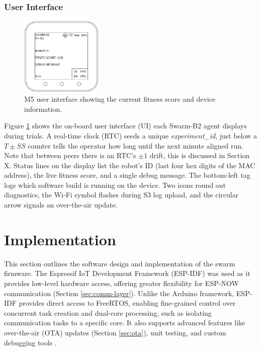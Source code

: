 \documentclass[conference]{IEEEtran}
\begin{document}
\subsubsection{User Interface}

\begin{figure}[h]
    \centering
    \includegraphics[width=0.35\textwidth]{UI.png}
    \caption{M5 user interface showing the current fitness score and device information.}
    \label{fig:UI}
\end{figure}

Figure \ref{fig:UI} shows the on-board user interface (UI) each Swarm-B2 agent displays during trials. A real-time clock (RTC) seeds a unique \emph{experiment\_id}, just below a $T\pm SS$ counter tells the operator how long until the next minute aligned run. Note that between peers there is an RTC's $\pm1$ drift, this is discussed in Section X. Status lines on the display list the robot's ID (last four hex digits of the MAC address), the live fitness score, and a single debug message. The bottom-left tag logs which software build is running on the device. Two icons round out diagnostics, the Wi-Fi symbol flashes during S3 log upload, and the circular arrow signals an over-the-air update.

\section{Implementation}

This section outlines the software design and implementation of the swarm firmware. The Espressif IoT Development Framework (ESP-IDF) was used as it provides low-level hardware access, offering greater flexibility for ESP-NOW communication (Section \ref{sec:comm-layer}). Unlike the Arduino framework, ESP-IDF provides direct access to FreeRTOS, enabling fine-grained control over concurrent task creation and dual-core processing, such as isolating communication tasks to a specific core. It also supports advanced features like over-the-air (OTA) updates (Section \ref{sec:ota}), unit testing, and custom debugging tools \cite{esp-boards_esp-idf_nodate}.
\end{document}
